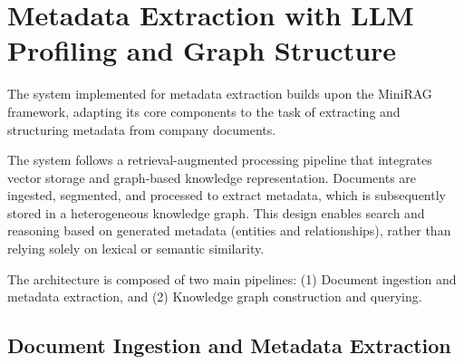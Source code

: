 \section{Metadata Extraction with \ac{LLM} Profiling and Graph Structure}

The system implemented for metadata extraction builds upon the MiniRAG framework, adapting its core components to the task of extracting and structuring metadata from company documents. 

The system follows a retrieval-augmented processing pipeline that integrates vector storage and graph-based knowledge representation.  
Documents are ingested, segmented, and processed to extract metadata, which is subsequently stored in a heterogeneous knowledge graph.  
This design enables search and reasoning based on generated metadata (entities and relationships), rather than relying solely on lexical or semantic similarity.

The architecture is composed of two main pipelines:  
(1) Document ingestion and metadata extraction, and  
(2) Knowledge graph construction and querying.

\subsection{Document Ingestion and Metadata Extraction}

